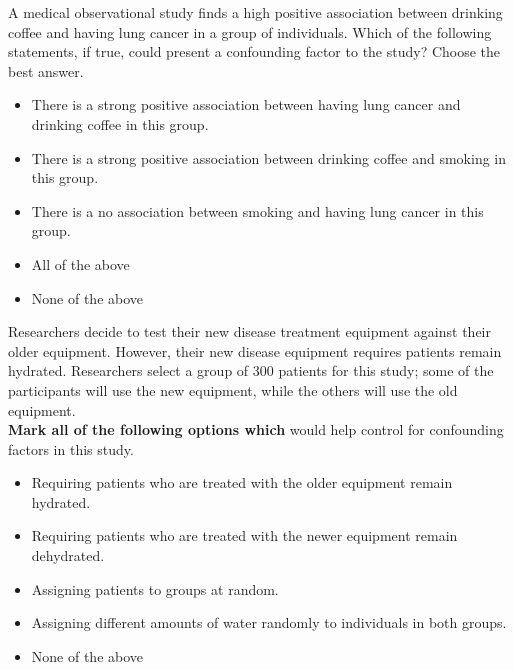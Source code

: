 
\begin{enumerate}

 A medical observational study finds a high positive association between drinking coffee and having lung cancer in a group of individuals. Which of the following statements, if true, could present a confounding factor to the study? Choose the best answer.  
\begin{itemize}[label = \bubble]
\item There is a strong positive association between having lung cancer and drinking coffee in this group.
\item There is a strong positive association between drinking coffee and smoking in this group.
\item There is a no association between smoking and having lung cancer in this group.
\item All of the above
\item None of the above 
\end{itemize}

 Researchers decide to test their new disease treatment equipment against their older equipment. However, their new disease equipment requires patients remain hydrated. Researchers select a group of 300 patients for this study; some of the participants will use the new equipment, while the others will use the old equipment. \\
\textbf{Mark all of the following options which} would help control for confounding factors in this study. 
\begin{itemize}[label = \bubble]
\item Requiring patients who are treated with the older equipment remain hydrated.
\item Requiring patients who are treated with the newer equipment remain dehydrated.
\item Assigning patients to groups at random.
\item Assigning different amounts of water randomly to individuals in both groups.
\item None of the above
\end{itemize}


\end{enumerate}

